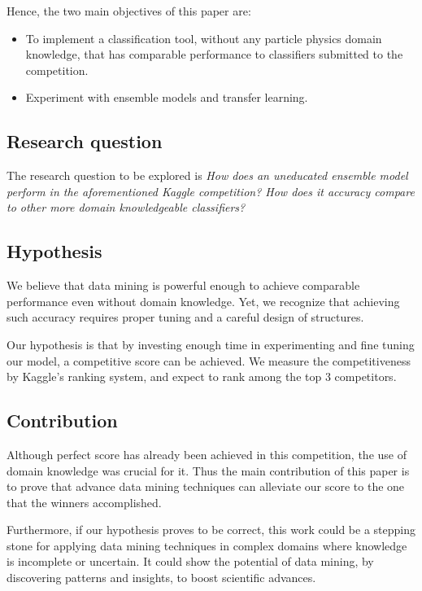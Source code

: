 \documentclass[conference]{IEEEtran}
\begin{document}
Hence, the two main objectives of this paper are:

\begin{itemize}
	\item To implement a classification tool, without any particle physics domain knowledge, that has comparable performance to classifiers submitted to the competition.
	\item Experiment with ensemble models and transfer learning. 
\end{itemize}

\subsection{Research question}
\label{sec:researchQuestions}
The research question to be explored is \textit{How does an uneducated ensemble model perform in the aforementioned Kaggle competition? How does it accuracy compare to other more domain knowledgeable classifiers?}

\subsection{Hypothesis}
\label{sec:hypothesis}
We believe that data mining is powerful enough to achieve comparable performance even without domain knowledge. Yet, we recognize that achieving such accuracy requires proper tuning and a careful design of structures. 

Our hypothesis is that by investing enough time in experimenting and fine tuning our model, a competitive score can be achieved. We measure the competitiveness by Kaggle's ranking system, and expect to rank among the top 3 competitors.

\subsection{Contribution}
Although perfect score has already been achieved in this competition, the use of domain knowledge was crucial for it. Thus the main contribution of this paper is to prove that advance data mining techniques can alleviate our score to the one that the winners accomplished.

Furthermore, if our hypothesis proves to be correct, this work could be a stepping stone for applying data mining techniques in complex domains where knowledge is incomplete or uncertain. It could show the potential of data mining, by discovering patterns and insights, to boost scientific advances. 
\end{document}
